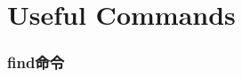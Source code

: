 ﻿\documentclass[a4paper,11pt]{article}
\begin{document}
  \tt %
  \pagestyle{header}
  \sybmaketitle
  \tableofcontents
  \newpage

  \pagestyle{main}
  \setcounter{page}{1}

  \part[Useful Commands]{Useful Commands}
  \section[find命令]{find命令}
  
\end{document}
